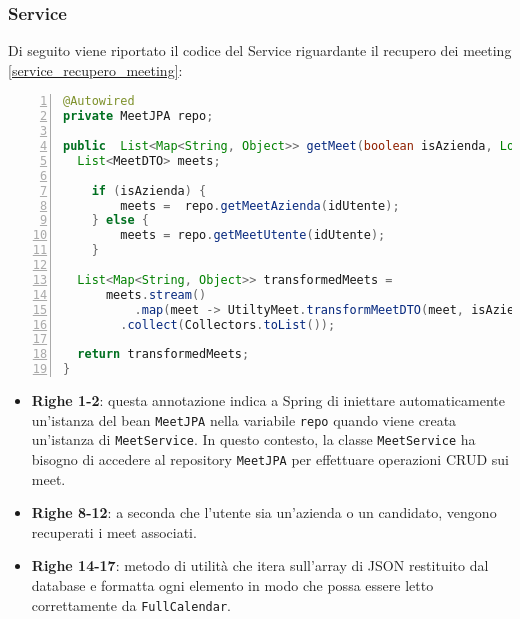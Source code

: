 \subsubsection{Service}
Di seguito viene riportato il codice del Service riguardante il recupero dei meeting \ref{service_recupero_meeting}: 
\begin{lstlisting}[language=java, frame=lines, basicstyle=\ttfamily\scriptsize, numbers=left, 
  label={service_recupero_meeting}, caption={service recupero meeting}]
@Autowired
private MeetJPA repo;

public  List<Map<String, Object>> getMeet(boolean isAzienda, Long idUtente) {
  List<MeetDTO> meets;

	if (isAzienda) {
		meets =  repo.getMeetAzienda(idUtente);
	} else {
		meets = repo.getMeetUtente(idUtente);
	}

  List<Map<String, Object>> transformedMeets = 
      meets.stream()
		  .map(meet -> UtiltyMeet.transformMeetDTO(meet, isAzienda))
        .collect(Collectors.toList());

  return transformedMeets;
}
\end{lstlisting}
\begin{itemize}
    \item \textbf{Righe 1-2}: questa annotazione indica a Spring di iniettare automaticamente un'istanza del bean \texttt{MeetJPA}
    nella variabile \texttt{repo} quando viene creata un'istanza di \texttt{MeetService}. \cite{AutoWiredSpring}
    In questo contesto, la classe \texttt{MeetService} ha bisogno di accedere al repository \texttt{MeetJPA} per effettuare
    operazioni CRUD sui meet.

    \item \textbf{Righe 8-12}: a seconda che l'utente sia un'azienda o un candidato, vengono recuperati i meet associati.
    
    \item \textbf{Righe 14-17}: metodo di utilità che itera sull'array di JSON restituito dal
    database e formatta ogni elemento in modo che possa essere letto correttamente da \texttt{FullCalendar}.
\end{itemize}